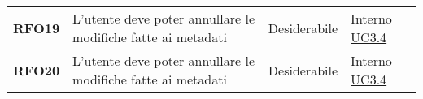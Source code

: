 \begin{longtable}[H]{>{\centering\bfseries}m{2cm} >{\centering}m{9cm} >{\centering}m{2.5cm} >{\centering\arraybackslash}m{2.5cm}}
    RFO19
    & L'utente deve poter annullare le modifiche fatte ai metadati
    & Desiderabile
    & Interno  \hyperref[ssub:uc3.4]{UC3.4} \\

    RFO20   
    & L'utente deve poter annullare le modifiche fatte ai metadati
    & Desiderabile
    & Interno  \hyperref[ssub:uc3.4]{UC3.4} \\


\end{longtable}
